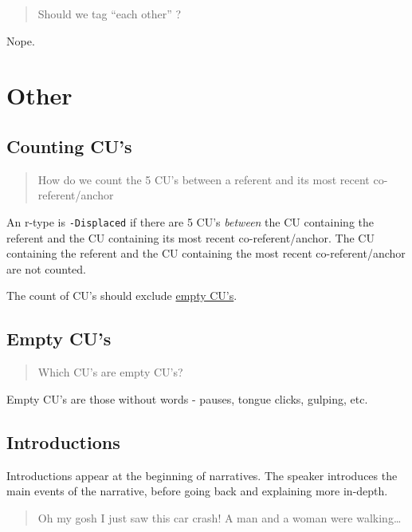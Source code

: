 \documentclass[
]{book}
\begin{document}
\begin{quote}
Should we tag ``each other'' ?
\end{quote}

Nope.

\hypertarget{other}{%
\section{Other}\label{other}}

\hypertarget{counting-cus}{%
\subsection{Counting CU's}\label{counting-cus}}

\begin{quote}
How do we count the 5 CU's between a referent and its most recent co-referent/anchor
\end{quote}

An r-type is \texttt{-Displaced} if there are 5 CU's \emph{between} the CU containing the referent and the CU containing its most recent co-referent/anchor.
The CU containing the referent and the CU containing the most recent co-referent/anchor are not counted.

The count of CU's should exclude \href{empty-cu's}{empty CU's}.

\hypertarget{empty-cus}{%
\subsection{Empty CU's}\label{empty-cus}}

\begin{quote}
Which CU's are empty CU's?
\end{quote}

Empty CU's are those without words - pauses, tongue clicks, gulping, etc.

\hypertarget{introductions}{%
\subsection{Introductions}\label{introductions}}

Introductions appear at the beginning of narratives.
The speaker introduces the main events of the narrative,
before going back and explaining more in-depth.

\begin{quote}
Oh my gosh I just saw this car crash!
A man and a woman were walking\ldots{}
\end{quote}
\end{document}
